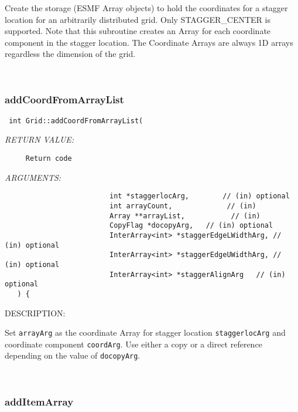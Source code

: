      Create the storage (ESMF Array objects) to hold the coordinates for a
   stagger location for an arbitrarily distributed grid. Only STAGGER_CENTER is
   supported. Note that this subroutine creates an Array for each 
   coordinate component in the stagger location. The Coordinate Arrays are
   always 1D arrays regardless the dimension of the grid. 
 
\mbox{}\hrulefill\ 
 
\subsubsection [addCoordFromArrayList] {addCoordFromArrayList}


  
\begin{verbatim} int Grid::addCoordFromArrayList(
 \end{verbatim}{\em RETURN VALUE:}
\begin{verbatim}     Return code\end{verbatim}{\em ARGUMENTS:}
\begin{verbatim}                         int *staggerlocArg,        // (in) optional
                         int arrayCount,             // (in) 
                         Array **arrayList,           // (in)
                         CopyFlag *docopyArg,   // (in) optional
                         InterArray<int> *staggerEdgeLWidthArg, // (in) optional
                         InterArray<int> *staggerEdgeUWidthArg, // (in) optional
                         InterArray<int> *staggerAlignArg   // (in) optional 
   ) {\end{verbatim}
{\sf DESCRIPTION:\\ }


      Set {\tt arrayArg} as the coordinate Array for stagger location 
   {\tt staggerlocArg} and coordinate component {\tt coordArg}. Use either
   a copy or a direct reference depending on the value of {\tt docopyArg}. 
 
\mbox{}\hrulefill\ 
 
\subsubsection [addItemArray] {addItemArray}


